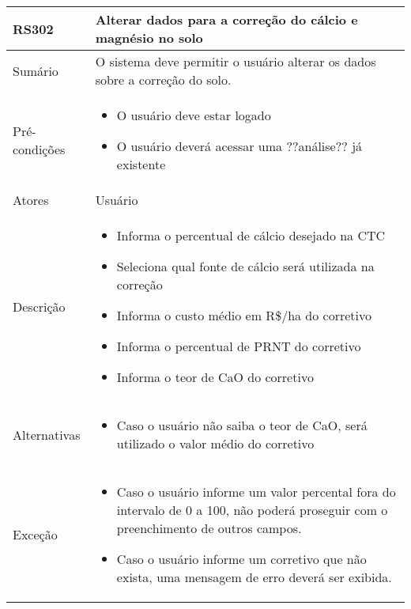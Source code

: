 \begin{quadro}[H]
    \begin{tabular}{|p{3cm}|p{11cm}|}
        \hline
        \textbf{RS302} & \textbf{Alterar dados para a correção do cálcio e magnésio no solo}          \\
        \hline
        Sumário        & O sistema deve permitir o usuário alterar os dados sobre a correção do solo. \\
        \hline
        Pré-condições  & \begin{itemize}
            \item O usuário deve estar logado
            \item O usuário deverá acessar uma ??análise?? já existente
        \end{itemize}                                                    \\
        \hline
        Atores         & Usuário                                                                      \\
        \hline
        Descrição      &
        \begin{itemize}
            \item Informa o percentual de cálcio desejado na CTC
            \item Seleciona qual fonte de cálcio será utilizada na correção
            \item Informa o custo médio em R\$/ha do corretivo
            \item Informa o percentual de PRNT do corretivo
            \item Informa o teor de CaO do corretivo
        \end{itemize}                                                                     \\
        \hline
        Alternativas   &
        \begin{itemize}
            \item Caso o usuário não saiba o teor de CaO, será utilizado o valor médio do corretivo
        \end{itemize}                                                                    \\
        \hline
        Exceção        &
        \begin{itemize}
            \item Caso o usuário informe um valor percental fora do intervalo de 0 a 100, não poderá proseguir com o preenchimento de outros campos.
            \item Caso o usuário informe um corretivo que não exista, uma mensagem de erro deverá ser exibida.
        \end{itemize}                                                                    \\
        \hline
    \end{tabular}
\end{quadro}

